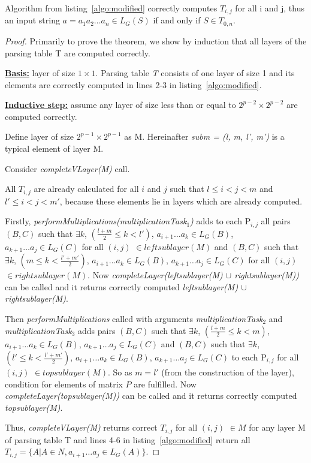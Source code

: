 \begin{theorem}
Algorithm from listing~\ref{algo:modified} correctly computes $T_{i, j}$ for all i and j, thus an input string $a = a_{1}a_{2} \dots a_{n} \in L_{G}(S)$ if and only if $S \in T_{0, n}$.
\end{theorem}

\begin{proof}

Primarily to prove the theorem, we show by induction that all layers of the parsing table T are computed correctly.

\underline{\textbf{Basis:}} layer of size $1 \times 1$.
Parsing table \textit{T} consists of one layer of size 1 and its elements are correctly computed in lines 2-3 in listing~\ref{algo:modified}.

\underline{\textbf{Inductive step:}} assume any layer of size less than or equal to $2^{p - 2} \times 2^{p - 2}$ are computed correctly. 

Define layer of size $2^{p - 1} \times 2^{p - 1}$ as M. 
Hereinafter \textit{subm = (l, m, l', m')} is a typical element of layer M.

Consider \textit{completeVLayer(M)} call. 

All $T_{i,j}$ are already calculated for all $i$ and $j$ such that $l \leq i < j < m$ and $l' \leq i < j < m'$, because these elements lie in layers which are already computed.

Firstly, \textit{performMultiplications(multiplicationTask$_1$)} adds to each P$_{i,j}$ all pairs 
$(B, C)$ such that $\exists k$, $(\frac{l+m}{2} \le k < l')$, $a_{i + 1} \dots a_{k} \in L_{G}(B)$, $a_{k + 1} \dots a_{j} \in L_{G}(C)$ for all $(i, j)$ $\in leftsublayer(M)$
and
$(B, C)$ such that $\exists k$, $(m \le k < \frac{l'+m'}{2})$, $a_{i + 1} \dots a_{k} \in L_{G}(B)$, $a_{k + 1} \dots a_{j} \in L_{G}(C)$ for all $(i, j)$ $\in rightsublayer(M)$.
Now \textit{completeLayer(leftsublayer(M) $\cup$ rightsublayer(M))} can be called and it returns correctly computed \textit{leftsublayer(M) $\cup$ rightsublayer(M)}.

Then \textit{performMultiplications} called with arguments 
\textit{multiplicationTask$_2$} and \textit{multiplicationTask$_3$} adds pairs 
$(B, C)$ such that $\exists k$, $(\frac{l+m}{2} \le k < m)$, $a_{i + 1} \dots a_{k} \in L_{G}(B)$, $a_{k + 1} \dots a_{j} \in L_{G}(C)$ 
and 
$(B, C)$ such that $\exists k$, $(l' \le k < \frac{l'+m'}{2})$, $a_{i + 1} \dots a_{k} \in L_{G}(B)$, $a_{k + 1} \dots a_{j} \in L_{G}(C)$
to each P$_{i,j}$ for all $(i, j)$ $\in topsublayer(M)$. 
So as $m = l'$ (from the construction of the layer), condition for elements of matrix $P$ are fulfilled.
Now \textit{completeLayer(topsublayer(M))} can be called and it returns correctly computed \textit{topsublayer(M)}.

Thus, \textit{completeVLayer(M)} returns correct $T_{i, j}$ for all $(i, j)$ $\in M$ for any layer M of parsing table T and lines 4-6 in listing~\ref{algo:modified} return all $T_{i, j} =  \{ A | A \in N, a_{i + 1} \dots a_{j} \in L_{G}(A)\}$.

\end{proof}

